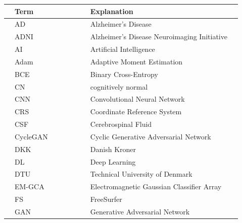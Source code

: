 \documentclass[11pt, fleqn, titlepage]{article}
\newcommand{\1}[1]{\mathds{1}\left[#1\right]}
\begin{document}
\begin{table}[H]\label{fig:files}
	\hspace*{-2cm}
	\begin{tabular}{l l l l l l l l l}
		\toprule
		& \textbf{Term} & & & & & & \textbf{Explanation}                                              & \\ \midrule
		& AD            & & & & & & Alzheimer's Disease                                               & \\
		& ADNI          & & & & & & Alzheimer's Disease Neuroimaging Initiative                       & \\
		& AI            & & & & & & Artificial Intelligence                                           & \\
		& Adam          & & & & & & Adaptive Moment Estimation                                        & \\
		& BCE           & & & & & & Binary Cross-Entropy                                              & \\
		& CN            & & & & & & cognitively normal                                                & \\
		& CNN           & & & & & & Convolutional Neural Network                                      & \\
		& CRS           & & & & & & Coordinate Reference System                                       & \\
		& CSF           & & & & & & Cerebrospinal Fluid                                               & \\
		& CycleGAN      & & & & & & Cyclic Generative Adversarial Network                             & \\
		& DKK           & & & & & & Danish Kroner                                                     & \\
		& DL            & & & & & & Deep Learning                                                     & \\
		& DTU           & & & & & & Technical University of Denmark                                   & \\
		& EM-GCA        & & & & & & Electromagnetic Gaussian Classifier Array                         & \\
		& FS            & & & & & & FreeSurfer                                                        & \\
		& GAN           & & & & & & Generative Adversarial Network                                    & \\

\end{tabular}
\end{table}
\end{document}
